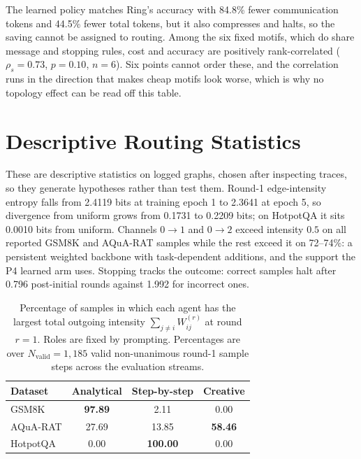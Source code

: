 \documentclass[11pt]{article}
\begin{document}
The learned policy matches Ring's accuracy with 84.8\% fewer communication
tokens and 44.5\% fewer total tokens, but it also compresses and halts, so the
saving cannot be assigned to routing. Among the six fixed motifs, which do share
message and stopping rules, cost and accuracy are positively rank-correlated
($\rho_s=0.73$, $p=0.10$, $n=6$). Six points cannot order these, and the
correlation runs in the direction that makes cheap motifs look worse, which is
why no topology effect can be read off this table.

\section{Descriptive Routing Statistics}
\label{app:descriptive}

These are descriptive statistics on logged graphs, chosen after inspecting
traces, so they generate hypotheses rather than test them. Round-1
edge-intensity entropy falls from 2.4119 bits at training epoch 1 to 2.3641 at
epoch 5, so divergence from uniform grows from 0.1731 to 0.2209 bits; on
HotpotQA it sits 0.0010 bits from uniform. Channels $0\to1$ and $0\to2$ exceed
intensity $0.5$ on all reported GSM8K and AQuA-RAT samples while the rest exceed
it on 72--74\%: a persistent weighted backbone with task-dependent additions,
and the support the P4 learned arm uses. Stopping tracks the
outcome: correct samples halt after 0.796 post-initial rounds against 1.992 for
incorrect ones.

\begin{table}[H]
\centering
\small
\setlength{\tabcolsep}{4pt}
\begin{tabular}{lccc}
\toprule
Dataset & Analytical & Step-by-step & Creative \\
\midrule
GSM8K    & \textbf{97.89} & 2.11 & 0.00 \\
AQuA-RAT & 27.69 & 13.85 & \textbf{58.46} \\
HotpotQA & 0.00 & \textbf{100.00} & 0.00 \\
\bottomrule
\end{tabular}
\caption{Percentage of samples in which each agent has the largest total
outgoing intensity $\sum_{j\neq i}W^{(r)}_{ij}$ at round $r=1$. Roles are fixed
by prompting. Percentages are over $N_{\mathrm{valid}}=1{,}185$ valid non-unanimous round-1 sample steps across the evaluation streams.}
\label{tab:leadership}
\end{table}
\end{document}

